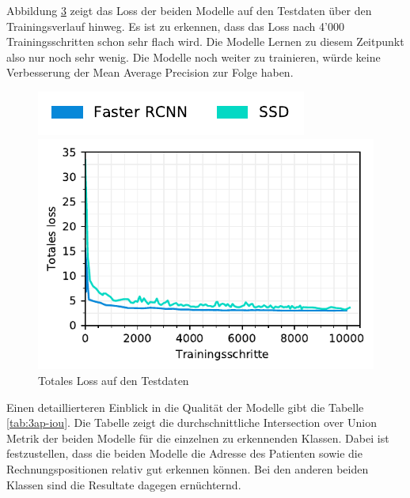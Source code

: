 \begin{figure}[H]
\begin{subfigure}[t]{0.5\linewidth}
    \label{fig:3ap-map:map_val}
    \vspace{2ex}
  \end{subfigure}
\end{figure}

Abbildung \ref{fig:3ap-map:loss} zeigt das Loss der beiden Modelle auf den Testdaten über den Trainingsverlauf hinweg. Es ist zu erkennen, dass das Loss nach 4'000 Trainingsschritten schon sehr flach wird. Die Modelle Lernen zu diesem Zeitpunkt also nur noch sehr wenig. Die Modelle noch weiter zu trainieren, würde keine Verbesserung der Mean Average Precision zur Folge haben.

\begin{figure}[h!] 
    \captionsetup{width=.9\linewidth}
    \caption{Totales Loss auf den Testdaten}
    \label{fig:3ap-map:loss}
    \centering
    \includegraphics[scale=1]{graphics/matplot/img-detection__legend_1.pdf}
    
    \includegraphics[scale=1]{graphics/matplot/img-detection__all__loss.pdf}
\end{figure}

Einen detaillierteren Einblick in die Qualität der Modelle gibt die Tabelle \ref{tab:3ap-iou}. Die Tabelle zeigt die durchschnittliche Intersection over Union Metrik der beiden Modelle für die einzelnen zu erkennenden Klassen. Dabei ist festzustellen, dass die beiden Modelle die Adresse des Patienten sowie die Rechnungspositionen relativ gut erkennen können. Bei den anderen beiden Klassen sind die Resultate dagegen ernüchternd.


